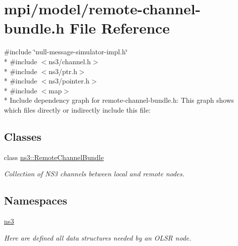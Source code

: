\hypertarget{remote-channel-bundle_8h}{}\section{mpi/model/remote-\/channel-\/bundle.h File Reference}
\label{remote-channel-bundle_8h}
{\ttfamily \#include \char`\"{}null-\/message-\/simulator-\/impl.\+h\char`\"{}}\\*
{\ttfamily \#include $<$ns3/channel.\+h$>$}\\*
{\ttfamily \#include $<$ns3/ptr.\+h$>$}\\*
{\ttfamily \#include $<$ns3/pointer.\+h$>$}\\*
{\ttfamily \#include $<$map$>$}\\*
Include dependency graph for remote-\/channel-\/bundle.h\+:
This graph shows which files directly or indirectly include this file\+:
\subsection*{Classes}
\begin{DoxyCompactItemize}
\item 
class \hyperlink{classns3_1_1RemoteChannelBundle}{ns3\+::\+Remote\+Channel\+Bundle}
\begin{DoxyCompactList}\small\item\em Collection of N\+S3 channels between local and remote nodes. \end{DoxyCompactList}\end{DoxyCompactItemize}
\subsection*{Namespaces}
\begin{DoxyCompactItemize}
\item 
 \hyperlink{namespacens3}{ns3}
\begin{DoxyCompactList}\small\item\em Here are defined all data structures needed by an O\+L\+SR node. \end{DoxyCompactList}\end{DoxyCompactItemize}
